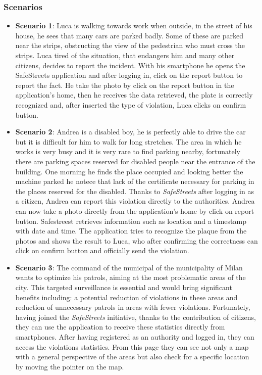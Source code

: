 \documentclass{article}
\begin{document}
\subsubsection{Scenarios}
\begin{itemize}
    \item \textbf{Scenario 1}:
    Luca is walking towards work when outside, in the street of his house, he sees that many cars are parked badly. 
    Some of these are parked near the strips, obstructing the view of the pedestrian who must cross the strips. 
    Luca tired of the situation, that endangers him and many other citizens, decides to report the incident. 
    With his smartphone he opens the SafeStreets application and after logging in, click on the report button to report the fact. 
    He take the photo by click on the report button in the application's home, then he receives the data retrieved, the plate is correctly 
    recognized and, after inserted the type of violation, Luca clicks on confirm button.

    \item \textbf{Scenario 2}:
    Andrea is a disabled boy, he is perfectly able to drive the car but it is difficult for him to walk for long stretches. 
    The area in which he works is very busy and it is very rare to find parking nearby, fortunately there are parking 
    spaces reserved for disabled people near the entrance of the building. One morning he finds the place occupied and looking 
    better the machine parked he notece that lack of the certificate necessary for parking in the places reserved for the disabled. 
    Thanks to \textit{SafeStreets} after logging in as a citizen, Andrea can report this violation directly to the authorities. 
    Andrea can now take a photo directly from the application's home by click on report button. Safestreest retrieves information such as 
    location and a timestamp with date and time. The application tries to recognize the plaque from the photos and shows the result to Luca, 
    who after confirming the correctness can click on confirm button and officially send the violation.

    \item \textbf{Scenario 3}:
    The command of the municipal of the municipality of Milan wants to optimize his patrols, aiming at the most problematic areas of the city.
    This targeted surveillance is essential and would bring significant benefits including: a potential reduction of violations in these areas
    and reduction of unnecessary patrols in areas with fewer violations. Fortunately, having joined the \textit{SafeStreets} initiative, thanks to the 
    contribution of citizens, they can use the application to receive these statistics directly from smartphones. After having 
    registered as an authority and logged in, they can access the violations statistics. From this page they can see not only a map with a general
    perspective of the areas but also check for a specific location by moving the pointer on the map.  


\end{itemize}
\end{document}
